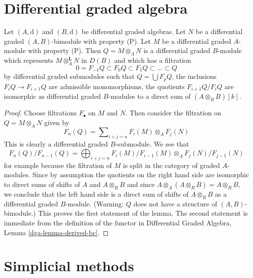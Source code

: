 \section{Differential graded algebra}
\label{section-dga}


\begin{lemma}
\label{lemma-P-not-preserved-base-change}
Let $(A, \text{d})$ and $(B, \text{d})$ be differential graded algebras.
Let $N$ be a differential graded $(A, B)$-bimodule with property
(P). Let $M$ be a differential graded $A$-module with property (P).
Then $Q = M \otimes_A N$ is a differential graded $B$-module which represents
$M \otimes_A^\mathbf{L} N$ in $D(B)$ and which has a filtration
$$
0 = F_{-1}Q \subset F_0Q \subset F_1Q \subset \ldots \subset Q
$$
by differential graded submodules such that $Q = \bigcup F_pQ$,
the inclusions $F_iQ \to F_{i + 1}Q$ are admissible monomorphisms,
the quotients $F_{i + 1}Q/F_iQ$ are isomorphic as differential
graded $B$-modules to a direct sum of $(A \otimes_R B)[k]$.
\end{lemma}

\begin{proof}
Choose filtrations $F_\bullet$ on $M$ and $N$. Then consider the filtration
on $Q = M \otimes_A N$ given by
$$
F_n(Q) = \sum\nolimits_{i + j = n}
F_i(M) \otimes_A F_j(N)
$$
This is clearly a differential graded $B$-submodule. We see that
$$
F_n(Q)/F_{n - 1}(Q) =
\bigoplus\nolimits_{i + j = n}
F_i(M)/F_{i - 1}(M) \otimes_A F_j(N)/F_{j - 1}(N)
$$
for example because the filtration of $M$ is split in the category
of graded $A$-modules. Since by assumption the quotients on the right
hand side are isomorphic to direct sums of shifts of $A$ and
$A \otimes_R B$ and since
$A \otimes_A (A \otimes_R B) = A \otimes_R B$,
we conclude that the left hand side is a direct sum of shifts
of $A \otimes_R B$ as a differential graded $B$-module.
(Warning: $Q$ does not have a structure of $(A, B)$-bimodule.)
This proves the first statement of the lemma.
The second statement is immediate from
the definition of the functor in
Differential Graded Algebra, Lemma \ref{dga-lemma-derived-bc}.
\end{proof}












\section{Simplicial methods}
\label{section-simplicial}



